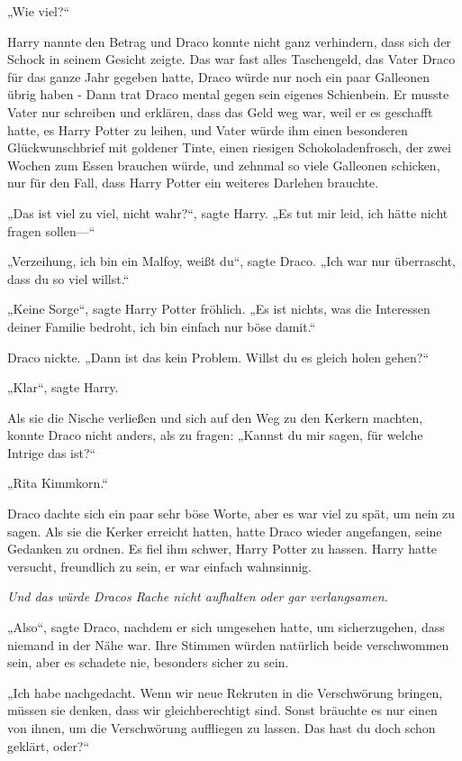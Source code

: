 {„Wie viel?“

Harry nannte den Betrag und Draco konnte nicht ganz verhindern, dass sich der Schock in seinem Gesicht zeigte. Das war fast alles Taschengeld, das Vater Draco für das ganze Jahr gegeben hatte, Draco würde nur noch ein paar Galleonen übrig haben - Dann trat Draco mental gegen sein eigenes Schienbein. Er musste Vater nur schreiben und erklären, dass das Geld weg war, weil er es geschafft hatte, es Harry Potter zu leihen, und Vater würde ihm einen besonderen Glückwunschbrief mit goldener Tinte, einen riesigen Schokoladenfrosch, der zwei Wochen zum Essen brauchen würde, und zehnmal so viele Galleonen schicken, nur für den Fall, dass Harry Potter ein weiteres Darlehen brauchte.

„Das ist viel zu viel, nicht wahr?“, sagte Harry. „Es tut mir leid, ich hätte nicht fragen sollen—“

„Verzeihung, ich bin ein Malfoy, weißt du“, sagte Draco. „Ich war nur überrascht, dass du so viel willst.“

„Keine Sorge“, sagte Harry Potter fröhlich. „Es ist nichts, was die Interessen deiner Familie bedroht, ich bin einfach nur böse damit.“

Draco nickte. „Dann ist das kein Problem. Willst du es gleich holen gehen?“

„Klar“, sagte Harry.

Als sie die Nische verließen und sich auf den Weg zu den Kerkern machten, konnte Draco nicht anders, als zu fragen: „Kannst du mir sagen, für welche Intrige das ist?“

„Rita Kimmkorn.“

Draco dachte sich ein paar sehr böse Worte, aber es war viel zu spät, um nein zu sagen. Als sie die Kerker erreicht hatten, hatte Draco wieder angefangen, seine Gedanken zu ordnen. Es fiel ihm schwer, Harry Potter zu hassen. Harry hatte versucht, freundlich zu sein, er war einfach wahnsinnig.

\emph{Und das würde Dracos Rache nicht aufhalten oder gar verlangsamen.}

„Also“, sagte Draco, nachdem er sich umgesehen hatte, um sicherzugehen, dass niemand in der Nähe war. Ihre Stimmen würden natürlich beide verschwommen sein, aber es schadete nie, besonders sicher zu sein.

„Ich habe nachgedacht. Wenn wir neue Rekruten in die Verschwörung bringen, müssen sie denken, dass wir gleichberechtigt sind. Sonst bräuchte es nur einen von ihnen, um die Verschwörung auffliegen zu lassen. Das hast du doch schon geklärt, oder?“

}
